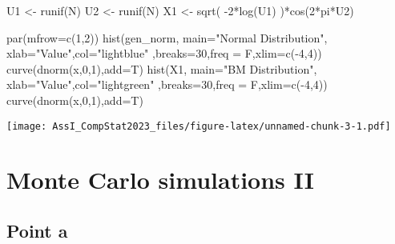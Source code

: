 \documentclass[
]{article}
\newenvironment{Shaded}{\begin{snugshade}}{\end{snugshade}}
\newcommand{\AttributeTok}[1]{\textcolor[rgb]{0.77,0.63,0.00}{#1}}
\newcommand{\DecValTok}[1]{\textcolor[rgb]{0.00,0.00,0.81}{#1}}
\newcommand{\FunctionTok}[1]{\textcolor[rgb]{0.00,0.00,0.00}{#1}}
\newcommand{\NormalTok}[1]{#1}
\newcommand{\OtherTok}[1]{\textcolor[rgb]{0.56,0.35,0.01}{#1}}
\newcommand{\SpecialCharTok}[1]{\textcolor[rgb]{0.00,0.00,0.00}{#1}}
\newcommand{\StringTok}[1]{\textcolor[rgb]{0.31,0.60,0.02}{#1}}
\begin{document}
\begin{Shaded}
\begin{Highlighting}[]
\NormalTok{U1 }\OtherTok{\textless{}{-}} \FunctionTok{runif}\NormalTok{(N)}
\NormalTok{U2 }\OtherTok{\textless{}{-}} \FunctionTok{runif}\NormalTok{(N)}
\NormalTok{X1 }\OtherTok{\textless{}{-}} \FunctionTok{sqrt}\NormalTok{( }\SpecialCharTok{{-}}\DecValTok{2}\SpecialCharTok{*}\FunctionTok{log}\NormalTok{(U1) )}\SpecialCharTok{*}\FunctionTok{cos}\NormalTok{(}\DecValTok{2}\SpecialCharTok{*}\NormalTok{pi}\SpecialCharTok{*}\NormalTok{U2)}

\FunctionTok{par}\NormalTok{(}\AttributeTok{mfrow=}\FunctionTok{c}\NormalTok{(}\DecValTok{1}\NormalTok{,}\DecValTok{2}\NormalTok{))}
\FunctionTok{hist}\NormalTok{(gen\_norm, }\AttributeTok{main=}\StringTok{"Normal Distribution"}\NormalTok{, }\AttributeTok{xlab=}\StringTok{"Value"}\NormalTok{,}\AttributeTok{col=}\StringTok{"lightblue"}\NormalTok{ ,}\AttributeTok{breaks=}\DecValTok{30}\NormalTok{,}\AttributeTok{freq =}\NormalTok{ F,}\AttributeTok{xlim=}\FunctionTok{c}\NormalTok{(}\SpecialCharTok{{-}}\DecValTok{4}\NormalTok{,}\DecValTok{4}\NormalTok{))}
\FunctionTok{curve}\NormalTok{(}\FunctionTok{dnorm}\NormalTok{(x,}\DecValTok{0}\NormalTok{,}\DecValTok{1}\NormalTok{),}\AttributeTok{add=}\NormalTok{T)}
\FunctionTok{hist}\NormalTok{(X1, }\AttributeTok{main=}\StringTok{"BM Distribution"}\NormalTok{, }\AttributeTok{xlab=}\StringTok{"Value"}\NormalTok{,}\AttributeTok{col=}\StringTok{"lightgreen"}\NormalTok{ ,}\AttributeTok{breaks=}\DecValTok{30}\NormalTok{,}\AttributeTok{freq =}\NormalTok{ F,}\AttributeTok{xlim=}\FunctionTok{c}\NormalTok{(}\SpecialCharTok{{-}}\DecValTok{4}\NormalTok{,}\DecValTok{4}\NormalTok{))}
\FunctionTok{curve}\NormalTok{(}\FunctionTok{dnorm}\NormalTok{(x,}\DecValTok{0}\NormalTok{,}\DecValTok{1}\NormalTok{),}\AttributeTok{add=}\NormalTok{T)}
\end{Highlighting}
\end{Shaded}

\texttt{[image: AssI\_CompStat2023\_files/figure-latex/unnamed-chunk-3-1.pdf]}

\hypertarget{monte-carlo-simulations-ii}{%
\section{Monte Carlo simulations II}\label{monte-carlo-simulations-ii}}

\hypertarget{point-a-2}{%
\subsection{Point a}\label{point-a-2}}
\end{document}
